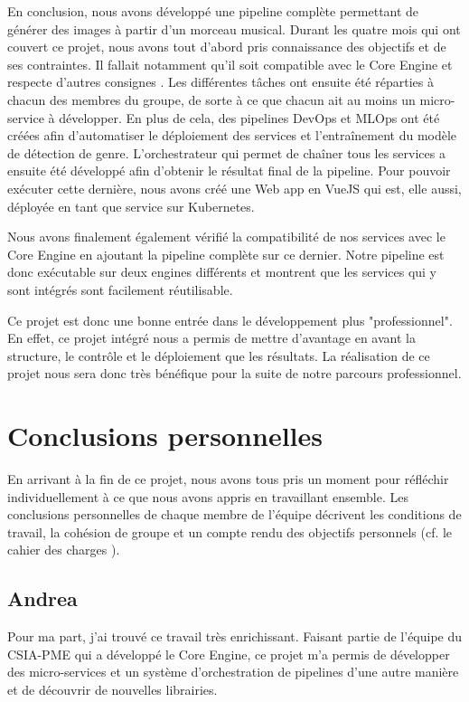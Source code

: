 En conclusion, nous avons développé une pipeline complète permettant de générer des images à partir d'un morceau musical. Durant les quatre mois qui ont couvert ce projet, nous avons tout d'abord pris connaissance des objectifs et de ses contraintes. Il fallait notamment qu'il soit compatible avec le Core Engine et respecte d'autres consignes \cite{CDC}. Les différentes tâches ont ensuite été réparties à chacun des membres du groupe, de sorte à ce que chacun ait au moins un micro-service à développer. En plus de cela, des pipelines DevOps et MLOps ont été créées afin d'automatiser le déploiement des services et l'entraînement du modèle de détection de genre. L'orchestrateur qui permet de chaîner tous les services a ensuite été développé afin d'obtenir le résultat final de la pipeline. Pour pouvoir exécuter cette dernière, nous avons créé une Web app en VueJS qui est, elle aussi, déployée en tant que service sur Kubernetes.

Nous avons finalement également vérifié la compatibilité de nos services avec le Core Engine en ajoutant la pipeline complète sur ce dernier. Notre pipeline est donc exécutable sur deux engines différents et montrent que les services qui y sont intégrés sont facilement réutilisable.

Ce projet est donc une bonne entrée dans le développement plus "professionnel". En effet, ce projet intégré nous a permis de mettre d'avantage en avant la structure, le contrôle et le déploiement que les résultats. La réalisation de ce projet nous sera donc très bénéfique pour la suite de notre parcours professionnel.

\section{Conclusions personnelles}

En arrivant à la fin de ce projet, nous avons tous pris un moment pour réfléchir individuellement à ce que nous avons appris en travaillant ensemble. Les conclusions personnelles de chaque membre de l'équipe décrivent les conditions de travail, la cohésion de groupe et un compte rendu des objectifs personnels (cf. le cahier des charges \cite{CDC}).

\subsection*{Andrea}
Pour ma part, j'ai trouvé ce travail très enrichissant. Faisant partie de l'équipe du CSIA-PME qui a développé le Core Engine, ce projet m'a permis de développer des micro-services et un système d'orchestration de pipelines d'une autre manière et de découvrir de nouvelles librairies.

